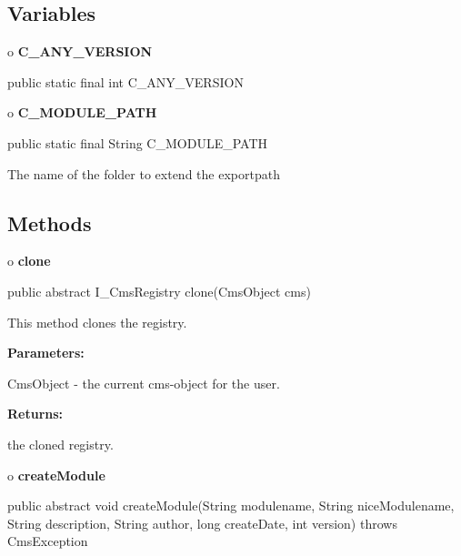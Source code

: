 \subsection*{  Variables }

o {\bf C\_ANY\_VERSION} 

\begin{PRE}
 public static final int C\_ANY\_VERSION
\end{PRE}

o {\bf C\_MODULE\_PATH} 

\begin{PRE}
 public static final String C\_MODULE\_PATH
\end{PRE}

\begin{description}
\htmlDD The name of the folder to extend the exportpath

\end{description}

\subsection*{  Methods }

o {\bf clone} 

\begin{PRE}
 public abstract I\_CmsRegistry clone(CmsObject cms)
\end{PRE}

\begin{description}
\htmlDD This method clones the registry. 

\begin{description}
\item {\bf Parameters:}  

CmsObject - the current cms-object for the user.  
\item {\bf Returns:}  

the cloned registry.  
\end{description}

\end{description}

o {\bf createModule} 

\begin{PRE}
 public abstract void createModule(String modulename,
                                   String niceModulename,
                                   String description,
                                   String author,
                                   long createDate,
                                   int version) throws CmsException
\end{PRE}

